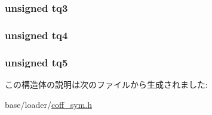 \label{structTIR_a543df74ca8233fc70a50ad50b2fe567e}
\hypertarget{structTIR_a8dc4b33bfc40bb4093ae8b8de2cf59b0}{
\subsubsection[{tq3}]{\setlength{\rightskip}{0pt plus 5cm}unsigned {\bf tq3}}}
\label{structTIR_a8dc4b33bfc40bb4093ae8b8de2cf59b0}
\hypertarget{structTIR_af0f5a4067c613c70800551d5a14d7e2d}{
\subsubsection[{tq4}]{\setlength{\rightskip}{0pt plus 5cm}unsigned {\bf tq4}}}
\label{structTIR_af0f5a4067c613c70800551d5a14d7e2d}
\hypertarget{structTIR_aee720ea4acfc7c04c5f43e5bba7371cf}{
\subsubsection[{tq5}]{\setlength{\rightskip}{0pt plus 5cm}unsigned {\bf tq5}}}
\label{structTIR_aee720ea4acfc7c04c5f43e5bba7371cf}


この構造体の説明は次のファイルから生成されました:\begin{DoxyCompactItemize}
\item 
base/loader/\hyperlink{coff__sym_8h}{coff\_\-sym.h}\end{DoxyCompactItemize}
